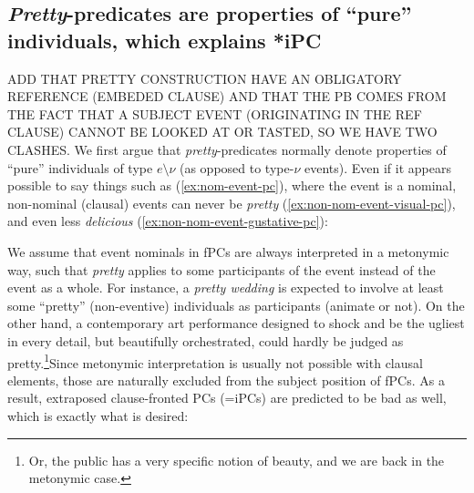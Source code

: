 \documentclass[11pt]{article}
\begin{document}
\subsection{\textit{Pretty}-predicates are properties of ``pure'' individuals, which explains *iPC}
ADD THAT PRETTY CONSTRUCTION HAVE AN OBLIGATORY REFERENCE (EMBEDED CLAUSE) AND THAT THE PB COMES FROM THE FACT THAT A SUBJECT EVENT (ORIGINATING IN THE REF CLAUSE) CANNOT BE LOOKED AT OR TASTED, SO WE HAVE TWO CLASHES.
We first argue that \textit{pretty}-predicates normally denote properties of ``pure'' individuals of type $e \setminus \nu$ (as opposed to type-$\nu$ events). Even if it appears possible to say things such as (\ref{ex:nom-event-pc}), where the event is a nominal, non-nominal (clausal) events can never be \textit{pretty} (\ref{ex:non-nom-event-visual-pc}), and even less \textit{delicious} (\ref{ex:non-nom-event-gustative-pc}):
\begin{exe}
	\ex
	\begin{xlist}
		\label{ex:nom-event-pc}
		\label{ex:non-nom-event-visual-pc}
		\label{ex:non-nom-event-gustative-pc}
	\end{xlist}
\end{exe}\label{ex:pretty-event-non-nominal}
We assume that event nominals in fPCs are always interpreted in a metonymic way, such that \textit{pretty} applies to some participants of the event instead of the event as a whole. For instance, a \textit{pretty wedding} is expected to involve at least some ``pretty'' (non-eventive) individuals as participants (animate or not). On the other hand, a contemporary art performance designed to shock and be the ugliest in every detail, but beautifully orchestrated, could hardly be judged as pretty.\footnote{Or, the public has a very specific notion of beauty, and we are back in the metonymic case.}Since metonymic interpretation is usually not possible with clausal elements, those are naturally excluded from the subject position of fPCs. As a result, extraposed clause-fronted PCs (=iPCs) are predicted to be bad as well, which is exactly what is desired:
\begin{exe}
	\ex 
	\begin{xlist}
		\ex[*] {\textbf{It} is pretty \textbf{to dance the waltz}. \hfill (\textbf{*iPC})}
	\end{xlist}
\end{exe}
\end{document}
